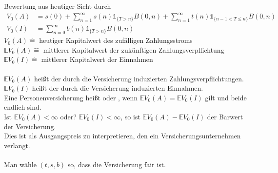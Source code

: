 Bewertung aus heutiger Sicht durch
\begin{equation*}
\begin{aligned}
	V_0(A) &= s(0)+\sum_{n=1}^{\infty}s(n) \mathbb{1}_{\{T>n\}}B(0,n)+\sum_{n=1}^{\infty}t(n)\mathbb{1}_{\{n-1<T\le n \}} B(0,n) \\
	V_0(I) &= \sum_{n=0}^{\infty}b(n)\mathbb{1}_{\{T>n\}} B(0,n)
\end{aligned}
\end{equation*}
$V_0(A) \mathrel{\hat{=}}$ heutiger Kapitalwert des zufälligen Zahlungsstroms\\
$\mathds{E}V_0(A) \mathrel{\hat{=}}$ mittlerer Kapitalwert der zukünftigen Zahlungsverpflichtung\\
$\mathds{E}V_0(I) \mathrel{\hat{=}}$ mittlerer Kapitalwert der Einnahmen\\
\\
$\mathds{E}V_0(A)$ heißt  der durch die Versicherung induzierten Zahlungsverpflichtungen. $\mathds{E}V_0(I)$ heißt  der durch die Versicherung induzierten Einnahmen.\\
Eine Personenversicherung heißt  oder , wenn $\mathds{E}V_0(A)=\mathds{E}V_0(I)$ gilt und beide endlich sind.\\
Ist $\mathds{E}V_0(A)<\infty$ oder? $\mathds{E}V_0(I)<\infty$, so ist $\mathds{E}V_0(A)-\mathds{E}V_0(I)$ der Barwert der Versicherung.\\
Dies ist als Ausgangspreis zu interpretieren, den ein Versicherungsunternehmen verlangt.\\
\\
Man wähle $(t,s,b)$ so, dass die Versicherung fair ist.


